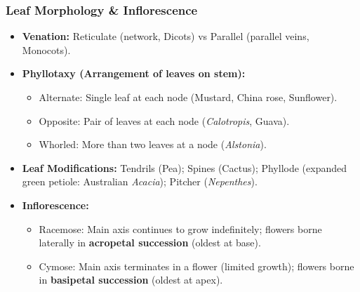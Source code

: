 \documentclass[11pt,a4paper]{article}
\begin{document}
\subsubsection{Leaf Morphology \& Inflorescence}
\begin{itemize}[leftmargin=1.5em, itemsep=2pt]
  \item \textbf{Venation:} Reticulate (network, Dicots) vs Parallel (parallel veins, Monocots).
  \item \textbf{Phyllotaxy (Arrangement of leaves on stem):}
  \begin{itemize}[label=$\circ$]
    \item Alternate: Single leaf at each node (Mustard, China rose, Sunflower).
    \item Opposite: Pair of leaves at each node (\textit{Calotropis}, Guava).
    \item Whorled: More than two leaves at a node (\textit{Alstonia}).
  \end{itemize}
  \item \textbf{Leaf Modifications:} Tendrils (Pea); Spines (Cactus); Phyllode (expanded green petiole: Australian \textit{Acacia}); Pitcher (\textit{Nepenthes}).
  \item \textbf{Inflorescence:}
  \begin{itemize}[label=$\circ$]
    \item Racemose: Main axis continues to grow indefinitely; flowers borne laterally in \textbf{acropetal succession} (oldest at base).
    \item Cymose: Main axis terminates in a flower (limited growth); flowers borne in \textbf{basipetal succession} (oldest at apex).
  \end{itemize}
\end{itemize}
\end{document}
